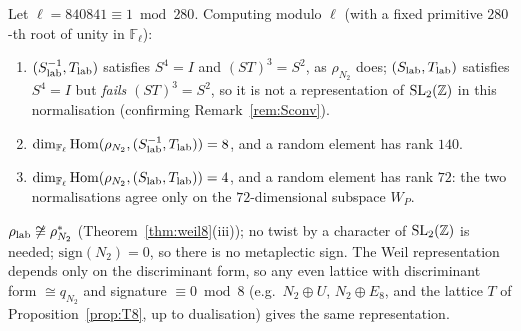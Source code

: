 \begin{proposition}\label{prop:hom8}
Let $\ell=840841\equiv1\bmod280$. Computing modulo $\ell$ (with a fixed primitive $280$-th root of unity in $\mathbb F_\ell$):
\begin{enumerate}[label=(\roman*)]
\item $(S_{\rm lab}^{-1},T_{\rm lab})$ satisfies $S^4=I$ and $(ST)^3=S^2$, as $\rho_{N_2}$ does; $(S_{\rm lab},T_{\rm lab})$ satisfies $S^4=I$ but \emph{fails} $(ST)^3=S^2$, so it is not a representation of $\mathrm{SL}_2(\mathbb{Z})$ in this normalisation (confirming Remark~\ref{rem:Sconv}).
\item $\dim_{\mathbb F_\ell}\mathrm{Hom}(\rho_{N_2},(S_{\rm lab}^{-1},T_{\rm lab}))=8$, and a random element has rank $140$.
\item $\dim_{\mathbb F_\ell}\mathrm{Hom}(\rho_{N_2},(S_{\rm lab},T_{\rm lab}))=4$, and a random element has rank $72$: the two normalisations agree only on the $72$-dimensional subspace $W_P$.
\end{enumerate}
\end{proposition}
\begin{remark}\label{rem:twist8}
$\rho_{\rm lab}\not\cong\rho_{N_2}^*$ (Theorem~\ref{thm:weil8}(iii)); no twist by a character of $\mathrm{SL}_2(\mathbb{Z})$ is needed; $\mathrm{sign}(N_2)=0$, so there is no metaplectic sign. The Weil representation depends only on the discriminant form, so any even lattice with discriminant form $\cong q_{N_2}$ and signature $\equiv0\bmod8$ (e.g.\ $N_2\oplus U$, $N_2\oplus E_8$, and the lattice $T$ of Proposition~\ref{prop:T8}, up to dualisation) gives the same representation.
\end{remark}

